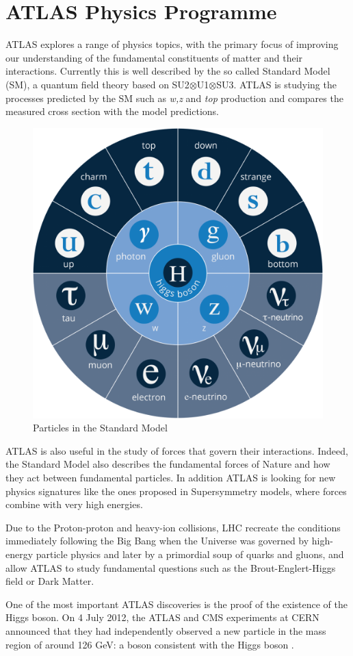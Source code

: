 \documentclass[a4paper, oneside, 11pt, openright]{book}
\begin{document}
		\section{ATLAS Physics Programme}
			\cite{STD Model}ATLAS explores a range of physics topics, with the primary focus of improving our understanding of the fundamental constituents of matter and their interactions. Currently this is well described by the so called Standard Model (SM), a quantum field theory based on SU2$\otimes$U1$\otimes$SU3.
			ATLAS is studying the processes predicted by the SM such as \textit{w,z} and \textit{top} production and compares the measured cross section with the model predictions.
			\begin{figure}[h!]
				\centering
				\includegraphics[width=.3\textwidth]{tesi_images/STD_model.png}
				\caption{Particles in the Standard Model}
				\label{fig:STD model}
			\end{figure}
			ATLAS is also useful in the study of forces that govern their interactions. Indeed, the Standard Model also describes the fundamental forces of Nature and how they act between fundamental particles. In addition ATLAS is looking for new physics signatures like the ones proposed in Supersymmetry models, where forces combine with very high energies.
			
			Due to the Proton-proton and heavy-ion collisions, LHC  recreate the conditions immediately following the Big Bang when the Universe was governed by high-energy particle physics and later by a primordial soup of quarks and gluons, and allow ATLAS to study fundamental questions such as the Brout-Englert-Higgs field or Dark Matter.
			
			One of the most important ATLAS discoveries is the proof of the existence of the Higgs boson. On 4 July 2012, the ATLAS and CMS \cite{CMS} experiments at CERN announced that they had independently observed a new particle in the mass region of around 126 GeV: a boson consistent with the Higgs boson \cite{Higgs}.
				
\end{document}
